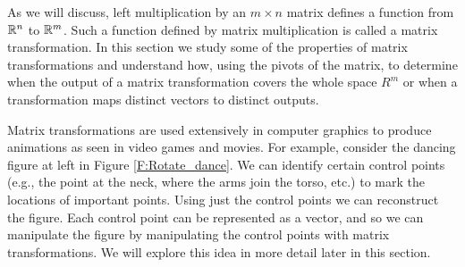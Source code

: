  \label{chap:matrix_transformations}

\vspace*{-17 pt}

\vspace*{13 pt}

\label{sec:appl_graphics}

As we will discuss, left multiplication by an $m \times n$ matrix defines a function from $\mathbb{R}^n$ to $\mathbb{R}^m$. Such a function defined by matrix multiplication is called a matrix transformation. In this section we study some of the properties of matrix transformations and understand how, using the pivots of the matrix, to determine when the output of a matrix transformation covers the whole space $R^m$ or when a transformation maps distinct vectors to distinct outputs. 

Matrix transformations are used extensively in computer graphics to produce animations as seen in video games and movies. For example, consider the dancing figure at left in Figure \ref{F:Rotate_dance}. We can identify certain control points (e.g., the point at the neck, where the arms join the torso, etc.) to mark the locations of important points. Using just the control points we can reconstruct the figure. Each control point can be represented as a vector, and so we can manipulate the figure by manipulating the control points with matrix transformations. We will explore this idea in more detail later in this section. 


